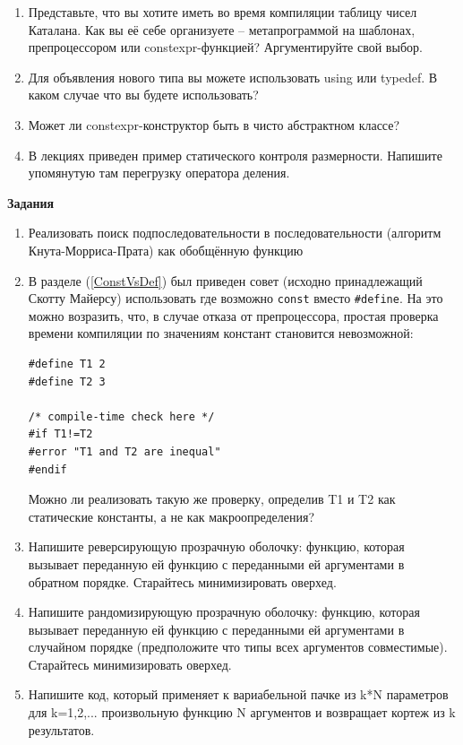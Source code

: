 \documentclass[a4paper,12pt,oneside]{article}
\begin{document}
\begin{enumerate}
\item Представьте, что вы хотите иметь во время компиляции таблицу чисел Каталана. Как вы её себе организуете -- метапрограммой на шаблонах, препроцессором или constexpr-функцией? Аргументируйте свой выбор.
\item Для объявления нового типа вы можете использовать using или typedef. В каком случае что вы будете использовать?
\item Может ли constexpr-конструктор быть в чисто абстрактном классе?
\item В лекциях приведен пример статического контроля размерности. Напишите упомянутую там перегрузку оператора деления.
\end{enumerate}

\textbf{Задания}

\begin{enumerate}

\item
Реализовать поиск подпоследовательности в последовательности (алгоритм Кнута-Морриса-Прата) как обобщённую функцию

\item
В разделе (\ref{ConstVsDef}) был приведен совет (исходно принадлежащий Скотту Майерсу) использовать где возможно \lstinline!const! вместо \lstinline!#define!. На это можно возразить, что, в случае отказа от препроцессора, простая проверка времени компиляции по значениям констант становится невозможной:

\begin{lstlisting}
#define T1 2
#define T2 3

/* compile-time check here */
#if T1!=T2
#error "T1 and T2 are inequal"
#endif
\end{lstlisting}

Можно ли реализовать такую же проверку, определив T1 и T2 как статические константы, а не как макроопределения?

\item 
Напишите реверсирующую прозрачную оболочку: функцию, которая вызывает переданную ей функцию с переданными ей аргументами в обратном порядке. Старайтесь минимизировать оверхед.

\item 
Напишите рандомизирующую прозрачную оболочку: функцию, которая вызывает переданную ей функцию с переданными ей аргументами в случайном порядке (предположите что типы всех аргументов совместимые). Старайтесь минимизировать оверхед.

\item 
Напишите код, который применяет к вариабельной пачке из k*N параметров для k=1,2,... произвольную функцию N аргументов и возвращает кортеж из k результатов.


\end{enumerate}
\end{document}
